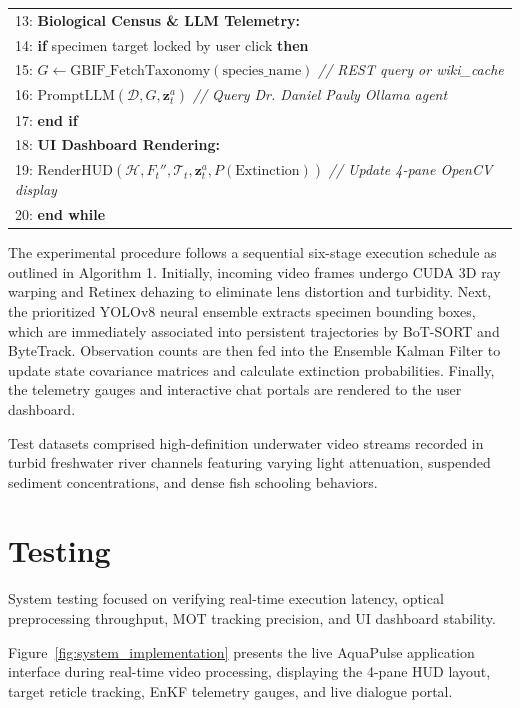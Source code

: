\documentclass[11pt,a4paper]{article}
\newcommand{\refblue}[1]{{\color{linkblue}\ref{#1}}}
\begin{document}
\begin{table}[htbp]
\begin{tabular}{p{15cm}}
13: \quad \textbf{Biological Census \& LLM Telemetry:} \\
14: \qquad \textbf{if} specimen target locked by user click \textbf{then} \\
15: \qquad \quad $G \leftarrow \text{GBIF\_FetchTaxonomy}(\text{species\_name})$ \quad \textit{// REST query or wiki\_cache} \\
16: \qquad \quad $\text{PromptLLM}(\mathcal{D}, G, \mathbf{z}_t^a)$ \quad \textit{// Query Dr. Daniel Pauly Ollama agent} \\
17: \qquad \textbf{end if} \\
18: \quad \textbf{UI Dashboard Rendering:} \\
19: \qquad $\text{RenderHUD}(\mathcal{H}, F_t'', \mathcal{T}_t, \mathbf{z}_t^a, P(\text{Extinction}))$ \quad \textit{// Update 4-pane OpenCV display} \\
20: \textbf{end while} \\
\bottomrule
\end{tabular}
\end{table}

The experimental procedure follows a sequential six-stage execution schedule as outlined in Algorithm 1. Initially, incoming video frames undergo CUDA 3D ray warping and Retinex dehazing to eliminate lens distortion and turbidity. Next, the prioritized YOLOv8 neural ensemble extracts specimen bounding boxes, which are immediately associated into persistent trajectories by BoT-SORT and ByteTrack. Observation counts are then fed into the Ensemble Kalman Filter to update state covariance matrices and calculate extinction probabilities. Finally, the telemetry gauges and interactive chat portals are rendered to the user dashboard.

Test datasets comprised high-definition underwater video streams recorded in turbid freshwater river channels featuring varying light attenuation, suspended sediment concentrations, and dense fish schooling behaviors.

\section{Testing}
System testing focused on verifying real-time execution latency, optical preprocessing throughput, MOT tracking precision, and UI dashboard stability.

Figure~\refblue{fig:system_implementation} presents the live AquaPulse application interface during real-time video processing, displaying the 4-pane HUD layout, target reticle tracking, EnKF telemetry gauges, and live dialogue portal.
\end{document}

